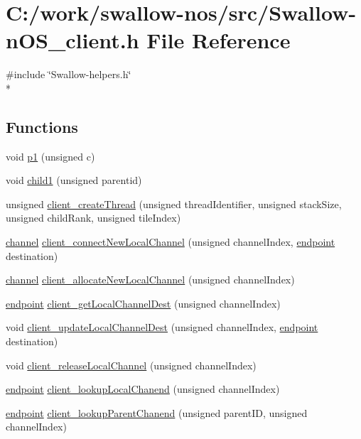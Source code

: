 \hypertarget{_swallow-n_o_s__client_8h}{}\section{C\+:/work/swallow-\/nos/src/\+Swallow-\/n\+O\+S\+\_\+client.h File Reference}
\label{_swallow-n_o_s__client_8h}
{\ttfamily \#include \char`\"{}Swallow-\/helpers.\+h\char`\"{}}\\*
\subsection*{Functions}
\begin{DoxyCompactItemize}
\item 
void \hyperlink{_swallow-n_o_s__client_8h_a0f2d4769f58abacde479814cdcc163b9}{p1} (unsigned c)
\item 
void \hyperlink{_swallow-n_o_s__client_8h_a0107d4627a5f64926798ff0690217834}{child1} (unsigned parentid)
\item 
unsigned \hyperlink{_swallow-n_o_s__client_8h_abeef5682e4ba7916b86579f520b189ca}{client\+\_\+create\+Thread} (unsigned thread\+Identifier, unsigned stack\+Size, unsigned child\+Rank, unsigned tile\+Index)
\item 
\hyperlink{_swallow-helpers_8h_aa6ea79b51cb1a11714e12ddd689dd15c}{channel} \hyperlink{_swallow-n_o_s__client_8h_a6936b888ab1416c7d5d6f95ed9fc606a}{client\+\_\+connect\+New\+Local\+Channel} (unsigned channel\+Index, \hyperlink{_swallow-helpers_8h_ab1358ba323e68c233f100abc11bdc7ea}{endpoint} destination)
\item 
\hyperlink{_swallow-helpers_8h_aa6ea79b51cb1a11714e12ddd689dd15c}{channel} \hyperlink{_swallow-n_o_s__client_8h_a4984ae0186883d0688f0bfdbebbcbca6}{client\+\_\+allocate\+New\+Local\+Channel} (unsigned channel\+Index)
\item 
\hyperlink{_swallow-helpers_8h_ab1358ba323e68c233f100abc11bdc7ea}{endpoint} \hyperlink{_swallow-n_o_s__client_8h_a5a8640c5003b3c5ecae959408ec3296a}{client\+\_\+get\+Local\+Channel\+Dest} (unsigned channel\+Index)
\item 
void \hyperlink{_swallow-n_o_s__client_8h_a64b8d179533337ed89f213bd716c3e27}{client\+\_\+update\+Local\+Channel\+Dest} (unsigned channel\+Index, \hyperlink{_swallow-helpers_8h_ab1358ba323e68c233f100abc11bdc7ea}{endpoint} destination)
\item 
void \hyperlink{_swallow-n_o_s__client_8h_a12c5cb8b4a5cac908bdb6c8db3ec5589}{client\+\_\+release\+Local\+Channel} (unsigned channel\+Index)
\item 
\hyperlink{_swallow-helpers_8h_ab1358ba323e68c233f100abc11bdc7ea}{endpoint} \hyperlink{_swallow-n_o_s__client_8h_ae2ecc339710d5a5e526001f3dba37d16}{client\+\_\+lookup\+Local\+Chanend} (unsigned channel\+Index)
\item 
\hyperlink{_swallow-helpers_8h_ab1358ba323e68c233f100abc11bdc7ea}{endpoint} \hyperlink{_swallow-n_o_s__client_8h_a382d0d1a4ba77407e420019041197d66}{client\+\_\+lookup\+Parent\+Chanend} (unsigned parent\+I\+D, unsigned channel\+Index)
\end{DoxyCompactItemize}


